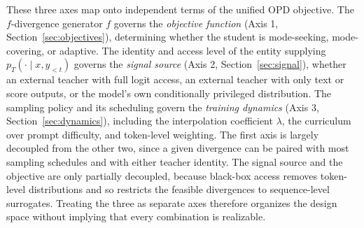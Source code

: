 \documentclass{article} %
\newcommand{\pteacher}{p_T}
\begin{document}
These three axes map onto independent terms of the unified OPD objective. The $f$-divergence generator $f$ governs the \emph{objective function} (Axis 1, Section~\ref{sec:objectives}), determining whether the student is mode-seeking, mode-covering, or adaptive. The identity and access level of the entity supplying $\pteacher(\cdot \mid x, y_{<t})$ governs the \emph{signal source} (Axis 2, Section~\ref{sec:signal}), whether an external teacher with full logit access, an external teacher with only text or score outputs, or the model's own conditionally privileged distribution. The sampling policy and its scheduling govern the \emph{training dynamics} (Axis 3, Section~\ref{sec:dynamics}), including the interpolation coefficient $\lambda$, the curriculum over prompt difficulty, and token-level weighting. The first axis is largely decoupled from the other two, since a given divergence can be paired with most sampling schedules and with either teacher identity. The signal source and the objective are only partially decoupled, because black-box access removes token-level distributions and so restricts the feasible divergences to sequence-level surrogates. Treating the three as separate axes therefore organizes the design space without implying that every combination is realizable.
\end{document}
